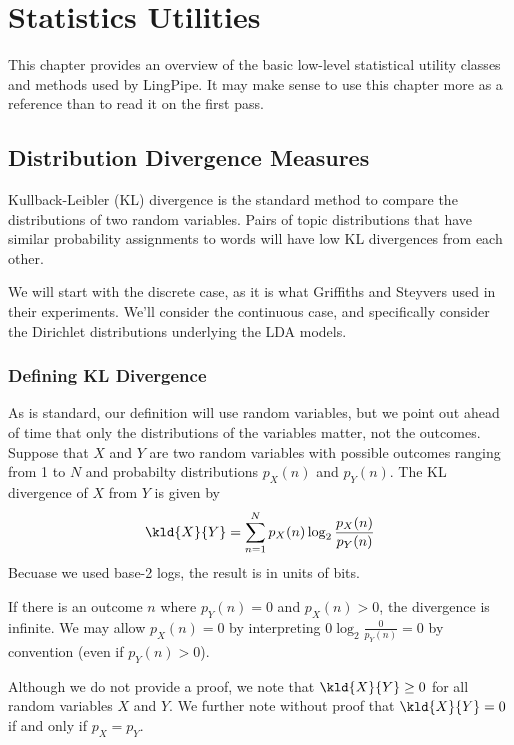 \chapter{Statistics Utilities}\label{chapter:stats}

This chapter provides an overview of the basic low-level statistical
utility classes and methods used by LingPipe.  It may make sense to
use this chapter more as a reference than to read it on the first
pass.

\section{Distribution Divergence Measures}\label{section:stats-divergence}

Kullback-Leibler (KL) divergence is the standard method to compare the
distributions of two random variables.  Pairs of topic distributions
that have similar probability assignments to words will have low KL
divergences from each other.

We will start with the discrete case, as it is what Griffiths and
Steyvers used in their experiments.  We'll consider the continuous
case, and specifically consider the Dirichlet distributions underlying
the LDA models.

\subsection{Defining KL Divergence}

As is standard, our definition will use random variables, but we point
out ahead of time that only the distributions of the variables matter,
not the outcomes.  Suppose that $X$ and $Y$ are two random variables
with possible outcomes ranging from 1 to $N$ and probabilty
distributions $p_X(n)$ and $p_Y(n)$.  The KL divergence of $X$ from
$Y$ is given by
%
\begin{equation}
\kld{X}{Y}
= \sum_{n=1}^N p_X(n) \log_2 \frac{p_X(n)}{p_Y(n)}
\end{equation}
%
Becuase we used base-2 logs, the result is in units of bits.  

If there is an outcome $n$ where $p_Y(n) = 0$ and $p_X(n) > 0$, the
divergence is infinite.  We may allow $p_X(n) = 0$ by interpreting $0
\log_2 \frac{0}{p_Y(n)} = 0$ by convention (even if $p_Y(n) > 0$).

Although we do not provide a proof, we note that $\kld{X}{Y} \geq 0$
for all random variables $X$ and $Y$.  We further note without proof
that $\kld{X}{Y} = 0$ if and only if $p_X = p_Y$.

